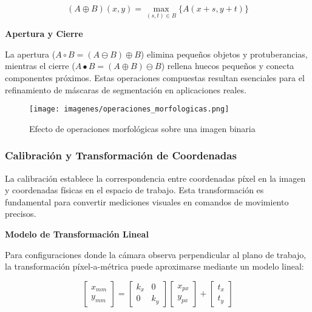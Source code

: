 \begin{equation}
(A \oplus B)(x,y) = \max_{(s,t) \in B} \{A(x+s, y+t)\}
\end{equation}

\textbf{Apertura y Cierre}

La apertura ($A \circ B = (A \ominus B) \oplus B$) elimina pequeños objetos y protuberancias, mientras el cierre ($A \bullet B = (A \oplus B) \ominus B$) rellena huecos pequeños y conecta componentes próximos. Estas operaciones compuestas resultan esenciales para el refinamiento de máscaras de segmentación en aplicaciones reales.

\begin{figure}[h]
\centering
\texttt{[image: imagenes/operaciones\_morfologicas.png]}
\caption{Efecto de operaciones morfológicas sobre una imagen binaria}
\label{fig:operaciones_morfologicas}
\end{figure}

\subsubsection{Calibración y Transformación de Coordenadas}

La calibración establece la correspondencia entre coordenadas píxel en la imagen y coordenadas físicas en el espacio de trabajo. Esta transformación es fundamental para convertir mediciones visuales en comandos de movimiento precisos.

\textbf{Modelo de Transformación Lineal}

Para configuraciones donde la cámara observa perpendicular al plano de trabajo, la transformación píxel-a-métrica puede aproximarse mediante un modelo lineal:

\begin{equation}
\begin{bmatrix} x_{mm} \\ y_{mm} \end{bmatrix} = \begin{bmatrix} k_x & 0 \\ 0 & k_y \end{bmatrix} \begin{bmatrix} x_{px} \\ y_{px} \end{bmatrix} + \begin{bmatrix} t_x \\ t_y \end{bmatrix}
\end{equation}

